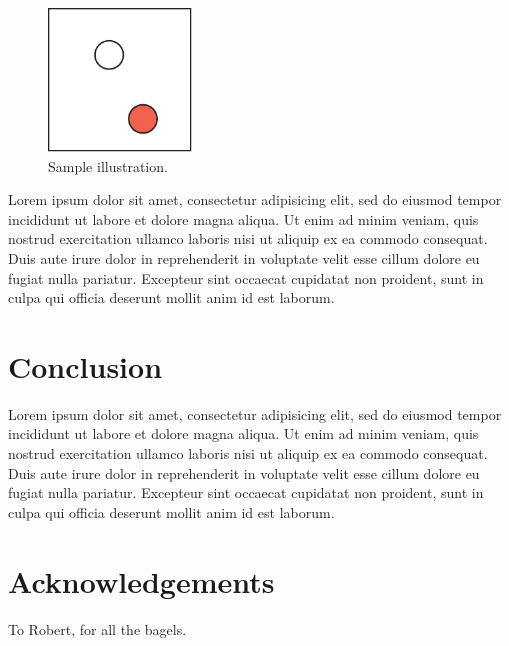 \documentclass[conference]{acmsiggraph}
\begin{document}
\begin{figure}[ht]
  \centering
  \includegraphics[width=1.5in]{images/samplefigure}
  \caption{Sample illustration.}
\end{figure}
Lorem ipsum dolor sit amet, consectetur adipisicing elit, sed do
eiusmod tempor incididunt ut labore et dolore magna aliqua. Ut enim ad
minim veniam, quis nostrud exercitation ullamco laboris nisi ut
aliquip ex ea commodo consequat. Duis aute irure dolor in
reprehenderit in voluptate velit esse cillum dolore eu fugiat nulla
pariatur. Excepteur sint occaecat cupidatat non proident, sunt in
culpa qui officia deserunt mollit anim id est laborum.

\section{Conclusion}

Lorem ipsum dolor sit amet, consectetur adipisicing elit, sed do
eiusmod tempor incididunt ut labore et dolore magna aliqua. Ut enim ad
minim veniam, quis nostrud exercitation ullamco laboris nisi ut
aliquip ex ea commodo consequat. Duis aute irure dolor in
reprehenderit in voluptate velit esse cillum dolore eu fugiat nulla
pariatur. Excepteur sint occaecat cupidatat non proident, sunt in
culpa qui officia deserunt mollit anim id est laborum.

\section*{Acknowledgements}

To Robert, for all the bagels.



\end{document}
